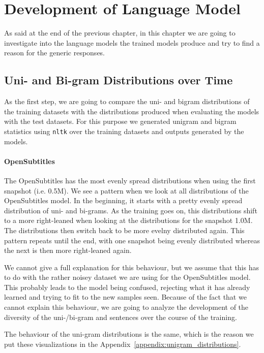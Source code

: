 \section{Development of Language Model}
\label{results:development_language_model}
As said at the end of the previous chapter, in this chapter we are going to investigate into the language models the trained models produce and try to find a reason for the generic responses.

\subsection{Uni- and Bi-gram Distributions over Time}
As the first step, we are going to compare the uni- and bigram distributions of the training datasets with the distributions produced when evaluating the models with the test datasets. For this purpose we generated unigram and bigram statistics using \texttt{nltk} over the training datasets and outputs generated by the models.

\paragraph{OpenSubtitles} The OpenSubtitles has the most evenly spread distributions when using the first snapshot (i.e. 0.5M). We see a pattern when we look at all distributions of the OpenSubtitles model. In the beginning, it starts with a pretty evenly spread distribution of uni- and bi-grams. As the training goes on, this distributions shift to a more right-leaned when looking at the distributions for the snapshot 1.0M. The distributions then switch back to be more evelny distributed again. This pattern repeats until the end, with one snapshot being evenly distributed whereas the next is then more right-leaned again.

We cannot give a full explanation for this behaviour, but we assume that this has to do with the rather noisey dataset we are using for the OpenSubtitles model. This probably leads to the model being confused, rejecting what it has already learned and trying to fit to the new samples seen. Because of the fact that we cannot explain this behaviour, we are going to analyze the development of the diversity of the uni-/bi-gram and sentences over the course of the training.

The behaviour of the uni-gram distributions is the same, which is the reason we put these visualizations in the Appendix~\ref{appendix:unigram_distributions}.

